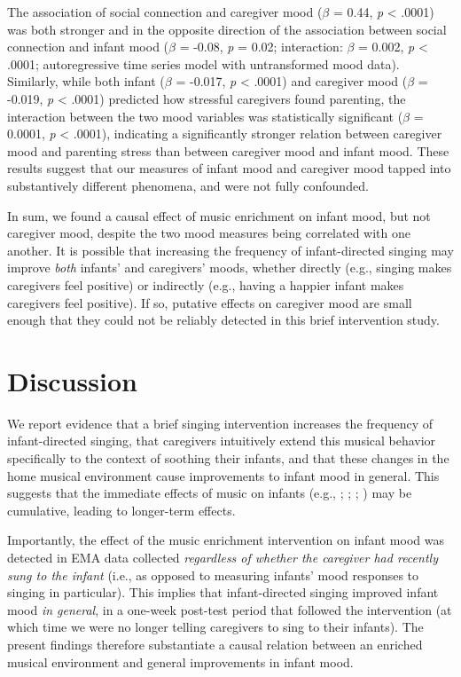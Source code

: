 \documentclass[
]{article}
\begin{document}
The association of social connection and caregiver mood (\(\beta\) =
0.44, \emph{p} \textless{} .0001) was both stronger and in the opposite
direction of the association between social connection and infant mood
(\(\beta\) = -0.08, \emph{p} = 0.02; interaction: \(\beta\) = 0.002,
\emph{p} \textless{} .0001; autoregressive time series model with
untransformed mood data). Similarly, while both infant (\(\beta\) =
-0.017, \emph{p} \textless{} .0001) and caregiver mood (\(\beta\) =
-0.019, \emph{p} \textless{} .0001) predicted how stressful caregivers
found parenting, the interaction between the two mood variables was
statistically significant (\(\beta\) = 0.0001, \emph{p} \textless{}
.0001), indicating a significantly stronger relation between caregiver
mood and parenting stress than between caregiver mood and infant mood.
These results suggest that our measures of infant mood and caregiver
mood tapped into substantively different phenomena, and were not fully
confounded.

In sum, we found a causal effect of music enrichment on infant mood, but
not caregiver mood, despite the two mood measures being correlated with
one another. It is possible that increasing the frequency of
infant-directed singing may improve \emph{both} infants' and caregivers'
moods, whether directly (e.g., singing makes caregivers feel positive)
or indirectly (e.g., having a happier infant makes caregivers feel
positive). If so, putative effects on caregiver mood are small enough
that they could not be reliably detected in this brief intervention
study.

\section{Discussion}\label{discussion}

We report evidence that a brief singing intervention increases the
frequency of infant-directed singing, that caregivers intuitively extend
this musical behavior specifically to the context of soothing their
infants, and that these changes in the home musical environment cause
improvements to infant mood in general. This suggests that the immediate
effects of music on infants (e.g.,
;
;
;
) may be cumulative,
leading to longer-term effects.

Importantly, the effect of the music enrichment intervention on infant
mood was detected in EMA data collected \emph{regardless of whether the
caregiver had recently sung to the infant} (i.e., as opposed to
measuring infants' mood responses to singing in particular). This
implies that infant-directed singing improved infant mood \emph{in
general}, in a one-week post-test period that followed the intervention
(at which time we were no longer telling caregivers to sing to their
infants). The present findings therefore substantiate a causal relation
between an enriched musical environment and general improvements in
infant mood.
\end{document}
